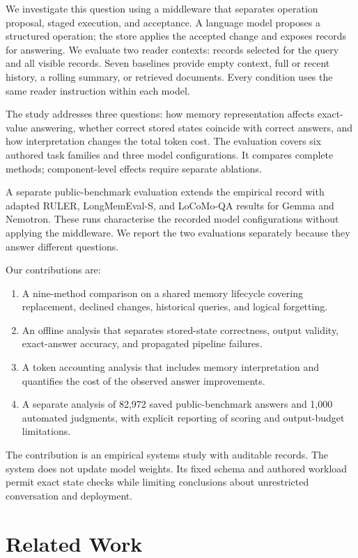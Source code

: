 \documentclass[11pt,a4paper]{article}
\begin{document}
We investigate this question using a middleware that separates operation proposal, staged execution, and acceptance. A language model proposes a structured operation; the store applies the accepted change and exposes records for answering. We evaluate two reader contexts: records selected for the query and all visible records. Seven baselines provide empty context, full or recent history, a rolling summary, or retrieved documents. Every condition uses the same reader instruction within each model.

The study addresses three questions: how memory representation affects exact-value answering, whether correct stored states coincide with correct answers, and how interpretation changes the total token cost. The evaluation covers six authored task families and three model configurations. It compares complete methods; component-level effects require separate ablations.

A separate public-benchmark evaluation extends the empirical record with adapted RULER, LongMemEval-S, and LoCoMo-QA results for Gemma and Nemotron. These runs characterise the recorded model configurations without applying the middleware. We report the two evaluations separately because they answer different questions.

Our contributions are:
\begin{enumerate}[leftmargin=*,itemsep=2pt]
\item A nine-method comparison on a shared memory lifecycle covering replacement, declined changes, historical queries, and logical forgetting.
\item An offline analysis that separates stored-state correctness, output validity, exact-answer accuracy, and propagated pipeline failures.
\item A token accounting analysis that includes memory interpretation and quantifies the cost of the observed answer improvements.
\item A separate analysis of 82,972 saved public-benchmark answers and 1,000 automated judgments, with explicit reporting of scoring and output-budget limitations.
\end{enumerate}
The contribution is an empirical systems study with auditable records. The system does not update model weights. Its fixed schema and authored workload permit exact state checks while limiting conclusions about unrestricted conversation and deployment.

\section{Related Work}
\end{document}
